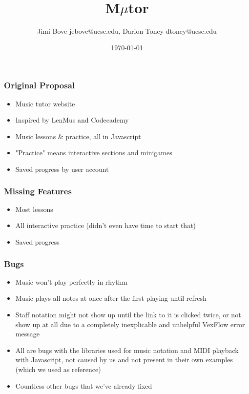 \documentclass[24pt]{beamer}
\title{M$\mu$tor}
\author{Jimi Bove jebove@ucsc.edu, Darion Toney dtoney@ucsc.edu}
\date{\today}
\begin{document}
\maketitle

\begin{frame}
\frametitle{Original Proposal}
\begin{itemize}
  \item Music tutor website
  \item Inspired by LenMus and Codecademy
  \item Music lessons \& practice, all in Javascript
  \item "Practice" means interactive sections and minigames
  \item Saved progress by user account
\end{itemize}
\end{frame}

\begin{frame}
\frametitle{Missing Features}
\begin{itemize}
  \item Most lessons
  \item All interactive practice (didn't even have time to start that)
  \item Saved progress
\end{itemize}
\end{frame}

\begin{frame}
\frametitle{Bugs}
\begin{itemize}
  \item Music won't play perfectly in rhythm
  \item Music plays all notes at once after the first playing until refresh
  \item Staff notation might not show up until the link to it is clicked twice, or not show up at all due to a completely inexplicable and unhelpful VexFlow error message
  \item All are bugs with the libraries used for music notation and MIDI playback with Javascript, not caused by us and not present in their own examples (which we used as reference)
  \item Countless other bugs that we've already fixed
\end{itemize}
\end{frame}
\end{document}
